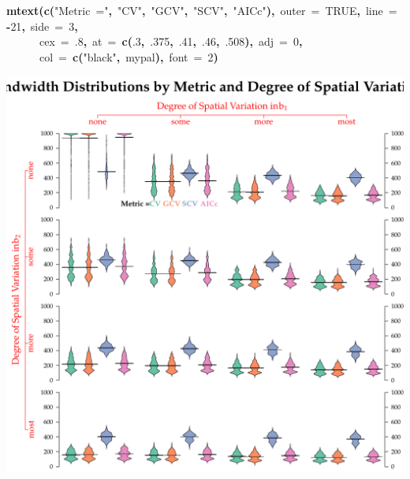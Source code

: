 \documentclass{article}
\makeatletter
\newcommand{\hlnumber}[1]{\textcolor[rgb]{0,0,0}{#1}}%
\newcommand{\hlfunctioncall}[1]{\textcolor[rgb]{0.501960784313725,0,0.329411764705882}{\textbf{#1}}}%
\newcommand{\hlstring}[1]{\textcolor[rgb]{0.6,0.6,1}{#1}}%
\newcommand{\hlkeyword}[1]{\textcolor[rgb]{0,0,0}{\textbf{#1}}}%
\newcommand{\hlargument}[1]{\textcolor[rgb]{0.690196078431373,0.250980392156863,0.0196078431372549}{#1}}%
\newcommand{\hlsymbol}[1]{\textcolor[rgb]{0,0,0}{#1}}%
\newcommand{\hlstd}[1]{\textcolor[rgb]{0,0,0}{#1}}%
\newenvironment{kframe}{%
 \def\FrameCommand##1{\hskip\@totalleftmargin \hskip-\fboxsep
 \colorbox{shadecolor}{##1}\hskip-\fboxsep
     \hskip-\linewidth \hskip-\@totalleftmargin \hskip\columnwidth}%
 \MakeFramed {\advance\hsize-\width
   \@totalleftmargin\z@ \linewidth\hsize
   \@setminipage}}%
 {\par\unskip\endMakeFramed}
\newenvironment{knitrout}{}{} %
\makeatother
\begin{document}
\begin{knitrout}
\begin{kframe}
\begin{flushleft}
\hlstd{}\hlfunctioncall{mtext}\hlkeyword{(}\hlfunctioncall{c}\hlkeyword{(}\hlstring{"{}Metric{\ }="{}}\hlkeyword{,}{\ }\hlstring{"{}CV"{}}\hlkeyword{,}{\ }\hlstring{"{}GCV"{}}\hlkeyword{,}{\ }\hlstring{"{}SCV"{}}\hlkeyword{,}{\ }\hlstring{"{}AICc"{}}\hlkeyword{)}\hlkeyword{,}{\ }\hlargument{outer}{\ }\hlargument{=}{\ }\hlnumber{TRUE}\hlkeyword{,}{\ }\hlargument{line}{\ }\hlargument{=}{\ }\hlkeyword{-}\hlnumber{21}\hlkeyword{,}{\ }\hlargument{side}{\ }\hlargument{=}{\ }\hlnumber{3}\hlkeyword{,}\hspace*{\fill}\\
\hlstd{}{\ }{\ }{\ }{\ }{\ }{\ }\hlargument{cex}{\ }\hlargument{=}{\ }\hlnumber{.8}\hlkeyword{,}{\ }\hlargument{at}{\ }\hlargument{=}{\ }\hlfunctioncall{c}\hlkeyword{(}\hlnumber{.3}\hlkeyword{,}{\ }\hlnumber{.375}\hlkeyword{,}{\ }\hlnumber{.41}\hlkeyword{,}{\ }\hlnumber{.46}\hlkeyword{,}{\ }\hlnumber{.508}\hlkeyword{)}\hlkeyword{,}{\ }\hlargument{adj}{\ }\hlargument{=}{\ }\hlnumber{0}\hlkeyword{,}\hspace*{\fill}\\
\hlstd{}{\ }{\ }{\ }{\ }{\ }{\ }\hlargument{col}{\ }\hlargument{=}{\ }\hlfunctioncall{c}\hlkeyword{(}\hlstring{"{}black"{}}\hlkeyword{,}{\ }\hlsymbol{mypal}\hlkeyword{)}\hlkeyword{,}{\ }\hlargument{font}{\ }\hlargument{=}{\ }\hlnumber{2}\hlkeyword{)}\mbox{}
\normalfont
\end{flushleft}
\end{kframe}

\includegraphics[width=.9\textwidth]{figure/MegaFig2} \hfill{}


\end{knitrout}
\end{document}

